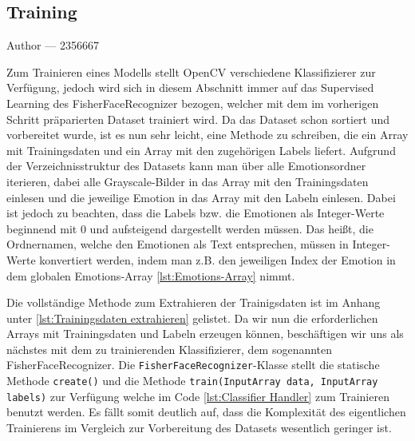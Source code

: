 \documentclass[12pt, a4paper]{report}
\makeatletter
\newcommand{\sectionauthor}[1]{%
  {\parindent0pt\vspace*{-5pt}%
  \large{Author --- }
  \linespread{1.1}\large\scshape#1%
  \par\nobreak\vspace*{35pt} }
  \@afterheading%
}
\makeatother
\begin{document}
\subsection{Training}
\sectionauthor{2356667}
Zum Trainieren eines Modells stellt OpenCV verschiedene Klassifizierer zur Verfügung, jedoch wird sich in diesem Abschnitt immer auf das Supervised Learning des FisherFaceRecognizer bezogen, welcher mit dem im vorherigen Schritt präparierten Dataset trainiert wird. Da das Dataset schon sortiert und vorbereitet wurde, ist es nun sehr leicht, eine Methode zu schreiben, die ein Array mit Trainingsdaten und ein Array mit den zugehörigen Labels liefert. Aufgrund der Verzeichnisstruktur des Datasets kann man über alle Emotionsordner iterieren, dabei alle Grayscale-Bilder in das Array mit den Trainingsdaten einlesen und die jeweilige Emotion in das Array mit den Labeln einlesen. Dabei ist jedoch zu beachten, dass die Labels bzw. die Emotionen als Integer-Werte beginnend mit 0 und aufsteigend dargestellt werden müssen. Das heißt, die Ordnernamen, welche den Emotionen als Text entsprechen, müssen in Integer-Werte konvertiert werden, indem man z.B. den jeweiligen Index der Emotion in dem globalen Emotions-Array \ref{lst:Emotions-Array} nimmt.

Die vollständige Methode zum Extrahieren der Trainigsdaten ist im Anhang unter \ref{lst:Trainingsdaten extrahieren} gelistet. 
Da wir nun die erforderlichen Arrays mit Trainingsdaten und Labeln erzeugen können, beschäftigen wir uns als nächstes mit dem zu trainierenden Klassifizierer, dem sogenannten FisherFaceRecognizer. Die \texttt{FisherFaceRecognizer}-Klasse stellt die statische Methode \texttt{create()} und die Methode \texttt{train(InputArray data, InputArray labels)} zur Verfügung welche im Code \ref{lst:Classifier Handler} zum Trainieren benutzt werden. Es fällt somit deutlich auf, dass die Komplexität des eigentlichen Trainierens im Vergleich zur Vorbereitung des Datasets wesentlich geringer ist.
\end{document}
